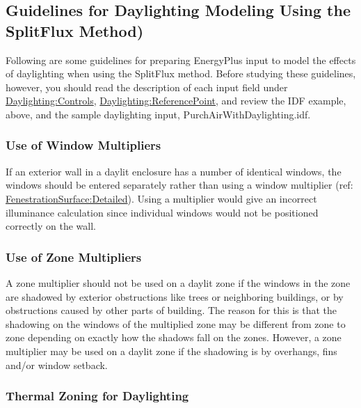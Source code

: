 \subsection{Guidelines for Daylighting Modeling Using the SplitFlux Method)}\label{guidelines-for-daylighting-modeling-splitflux-method}

Following are some guidelines for preparing EnergyPlus input to model the effects of daylighting when using the SplitFlux method. Before studying these guidelines, however, you should read the description of each input field under \hyperref[daylightingcontrols-000]{Daylighting:Controls}, \hyperref[daylightingreferencepoint-000]{Daylighting:ReferencePoint}, and review the IDF example, above, and the sample daylighting input, PurchAirWithDaylighting.idf.

\subsubsection{Use of Window Multipliers}\label{use-of-window-multipliers}

If an exterior wall in a daylit enclosure has a number of identical windows, the windows should be entered separately rather than using a window multiplier (ref: \hyperref[fenestrationsurfacedetailed]{FenestrationSurface:Detailed}). Using a multiplier would give an incorrect illuminance calculation since individual windows would not be positioned correctly on the wall.

\subsubsection{Use of Zone Multipliers}\label{use-of-zone-multipliers}

A zone multiplier should not be used on a daylit zone if the windows in the zone are shadowed by exterior obstructions like trees or neighboring buildings, or by obstructions caused by other parts of building. The reason for this is that the shadowing on the windows of the multiplied zone may be different from zone to zone depending on exactly how the shadows fall on the zones. However, a zone multiplier may be used on a daylit zone if the shadowing is by overhangs, fins and/or window setback.

\subsubsection{Thermal Zoning for Daylighting}\label{thermal-zoning-for-daylighting}

